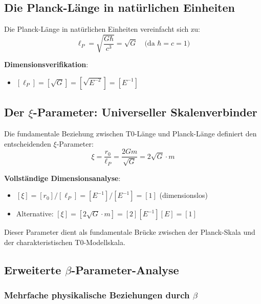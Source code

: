 \documentclass[12pt,a4paper]{article}
\begin{document}
\subsection{Die Planck-Länge in natürlichen Einheiten}
\label{subsec:planck_length_natural}

Die Planck-Länge in natürlichen Einheiten vereinfacht sich zu:
\begin{equation}
	\ell_P = \sqrt{\frac{G\hbar}{c^3}} = \sqrt{G} \quad \text{(da } \hbar = c = 1\text{)}
\end{equation}

\textbf{Dimensionsverifikation}:
\begin{itemize}
	\item $[\ell_P] = [\sqrt{G}] = [\sqrt{E^{-2}}] = [E^{-1}]$ \checkmark
\end{itemize}

\subsection{Der $\xi$-Parameter: Universeller Skalenverbinder}
\label{subsec:xi_universal_connector}

Die fundamentale Beziehung zwischen T0-Länge und Planck-Länge definiert den entscheidenden $\xi$-Parameter:
\begin{equation}
	\boxed{\xi = \frac{r_0}{\ell_P} = \frac{2Gm}{\sqrt{G}} = 2\sqrt{G} \cdot m}
\end{equation}

\textbf{Vollständige Dimensionsanalyse}:
\begin{itemize}
	\item $[\xi] = [r_0]/[\ell_P] = [E^{-1}]/[E^{-1}] = [1]$ (dimensionslos) \checkmark
	\item Alternative: $[\xi] = [2\sqrt{G} \cdot m] = [2][E^{-1}][E] = [1]$ \checkmark
\end{itemize}

Dieser Parameter dient als fundamentale Brücke zwischen der Planck-Skala und der charakteristischen T0-Modellskala.

\subsection{Erweiterte $\beta$-Parameter-Analyse}
\label{subsec:beta_enhanced_analysis}

\subsubsection{Mehrfache physikalische Beziehungen durch $\beta$}
\label{subsubsec:beta_multiple_relationships}
\end{document}
